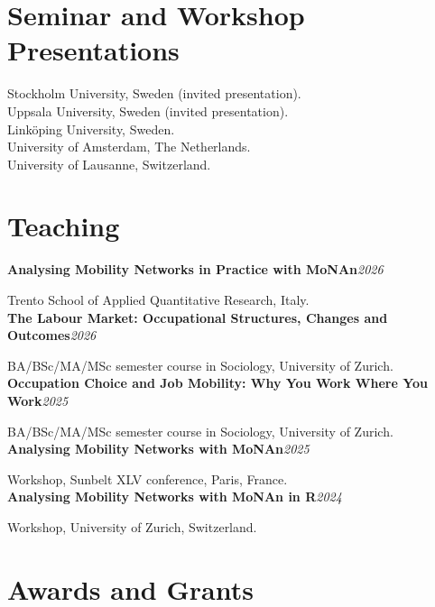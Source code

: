 \documentclass[11pt,a4paper]{article}
\newcommand{\entrynodetail}[2]{%
    \noindent\textbf{#1}\hfill\textit{\color{lighttext}#2}\par\vspace{0.1em}
}
\newcommand{\yr}[1]{\makebox[3em][l]{\textbf{#1}}}
\begin{document}
\section{Seminar and Workshop Presentations}

\yr{2026}Stockholm University, Sweden (invited presentation).\\
\yr{}Uppsala University, Sweden (invited presentation).\\
\yr{}Link\"oping University, Sweden.\\[0.2em]
\yr{2025}University of Amsterdam, The Netherlands.\\[0.2em]
\yr{2024}University of Lausanne, Switzerland.

\section{Teaching}

\entrynodetail{Analysing Mobility Networks in Practice with MoNAn}{2026}
{\small\color{lighttext} Trento School of Applied Quantitative Research, Italy.}\\[0.2em]
\entrynodetail{The Labour Market: Occupational Structures, Changes and Outcomes}{2026}
{\small\color{lighttext} BA/BSc/MA/MSc semester course in Sociology, University of Zurich.}\\[0.2em]
\entrynodetail{Occupation Choice and Job Mobility: Why You Work Where You Work}{2025}
{\small\color{lighttext} BA/BSc/MA/MSc semester course in Sociology, University of Zurich.}\\[0.2em]
\entrynodetail{Analysing Mobility Networks with MoNAn}{2025}
{\small\color{lighttext} Workshop, Sunbelt XLV conference, Paris, France.}\\[0.2em]
\entrynodetail{Analysing Mobility Networks with MoNAn in R}{2024}
{\small\color{lighttext} Workshop, University of Zurich, Switzerland.}

\section{Awards and Grants}
\end{document}
